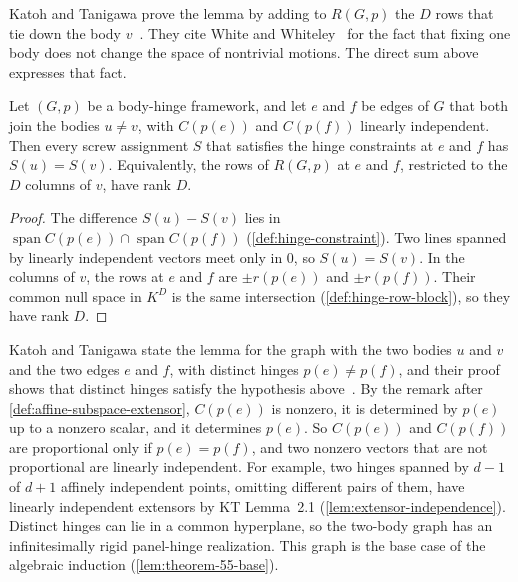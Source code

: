 Katoh and Tanigawa prove the lemma by adding to $R(G,p)$ the $D$ rows
that tie down the body $v$~\cite[p.~668]{katohTanigawa2011}. They cite
White and Whiteley~\cite[\S2]{whiteWhiteley1987} for the fact that
fixing one body does not change the space of nontrivial motions. The
direct sum above expresses that fact.

\begin{lemma}
  \label{lem:rank-parallel-full}
  \leanok
  Let $(G,p)$ be a body-hinge framework, and let $e$ and $f$ be edges of
  $G$ that both join the bodies $u \neq v$, with $C(p(e))$ and
  $C(p(f))$ linearly independent. Then every screw assignment $S$ that
  satisfies the hinge constraints at $e$ and $f$ has $S(u) = S(v)$.
  Equivalently, the rows of $R(G,p)$ at $e$ and $f$, restricted to the
  $D$ columns of $v$, have rank $D$.
\end{lemma}
\begin{proof}
  \leanok
  The difference $S(u) - S(v)$ lies in
  $\operatorname{span} C(p(e)) \cap \operatorname{span} C(p(f))$
  (\cref{def:hinge-constraint}). Two lines spanned by linearly
  independent vectors meet only in $0$, so $S(u) = S(v)$. In the
  columns of $v$, the rows at $e$ and $f$ are $\pm r(p(e))$ and
  $\pm r(p(f))$. Their common null space in $K^D$ is the same
  intersection (\cref{def:hinge-row-block}), so they have rank $D$.
\end{proof}

Katoh and Tanigawa state the lemma for the graph with the two bodies
$u$ and $v$ and the two edges $e$ and $f$, with distinct hinges
$p(e) \neq p(f)$, and their proof shows that distinct hinges satisfy
the hypothesis above~\cite[p.~670]{katohTanigawa2011}. By the remark
after \cref{def:affine-subspace-extensor}, $C(p(e))$ is nonzero, it is
determined by $p(e)$ up to a nonzero scalar, and it determines $p(e)$.
So $C(p(e))$ and $C(p(f))$ are proportional only if $p(e) = p(f)$, and
two nonzero vectors that are not proportional are linearly
independent. For example, two hinges spanned by $d - 1$ of $d + 1$
affinely independent points, omitting different pairs of them, have
linearly independent extensors by KT Lemma~2.1
(\cref{lem:extensor-independence}). Distinct hinges can lie in a common
hyperplane, so the two-body graph has an infinitesimally rigid
panel-hinge realization. This graph is the base case of the algebraic
induction (\cref{lem:theorem-55-base}).


